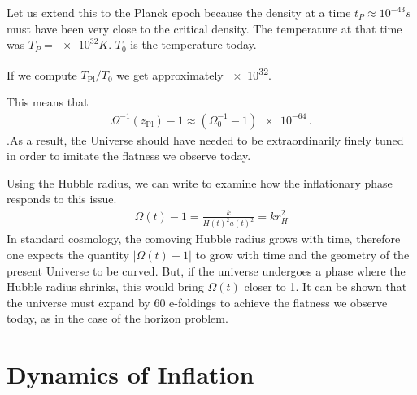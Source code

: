 Let us extend this to the Planck epoch because the density at a time $t_P \approx 10^{-43}s$ must have been very close to the critical density. The temperature at that time was $T_P = \num{e32} K $. $T_{0}$ is the temperature today.


If we compute \(T _{\text{Pl}} / T_0 \) we get approximately \num{e32}.

This means that 
\begin{align}
    \Omega^{-1}(z_{\text{Pl}}) - 1 \approx (\Omega_0^{-1} - 1) \num{e-64}\,.
\end{align}
.As a result, the Universe should have needed to be extraordinarily finely tuned in order to imitate the flatness we observe today.

Using the Hubble radius, we can write to examine how the inflationary phase responds to this issue.
\begin{align}
    \Omega(t)-1 = \frac{k}{H(t)^{2} a(t)^{2}} = kr_{H}^2
\end{align}
In standard cosmology, the comoving Hubble radius grows with time,
therefore one expects the quantity $|\Omega(t)-1|$ to grow with time and the geometry of the present Universe to be curved. But,
if the universe undergoes a phase where the Hubble radius shrinks, this would bring $\Omega(t)$ closer to 1. It can be shown that the universe must expand by 60 e-foldings to achieve the flatness we observe today, as in the case of the horizon problem.



\section{Dynamics of Inflation}

